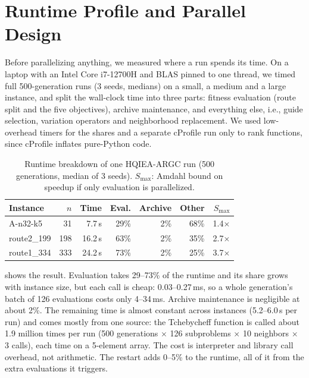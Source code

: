 \section{Runtime Profile and Parallel Design}
\label{sec:parallel}

Before parallelizing anything, we measured where a run spends its time. On a
laptop with an Intel Core i7-12700H and BLAS pinned to one thread, we timed full 500-generation
runs (3 seeds, medians) on a small, a medium and a large instance, and split the
wall-clock time into three parts: fitness evaluation (route split and the five
objectives), archive maintenance, and everything else, i.e., guide selection,
variation operators and neighborhood replacement. We used low-overhead timers for
the shares and a separate cProfile run only to rank functions, since cProfile
inflates pure-Python code.

\begin{table}[t]
\centering
\caption{Runtime breakdown of one HQIEA-ARGC run (500 generations, median of 3
seeds). $S_{\max}$: Amdahl bound on speedup if only evaluation is parallelized.}
\label{tab:profile}
\setlength{\tabcolsep}{3.5pt}
\begin{tabular}{@{}lrrrrrr@{}}
\toprule
Instance & $n$ & Time & Eval. & Archive & Other & $S_{\max}$ \\
\midrule
A-n32-k5    & 31  & 7.7\,s  & 29\% & 2\% & 68\% & 1.4$\times$ \\
route2\_199 & 198 & 16.2\,s & 63\% & 2\% & 35\% & 2.7$\times$ \\
route1\_334 & 333 & 24.2\,s & 73\% & 2\% & 25\% & 3.7$\times$ \\
\bottomrule
\end{tabular}
\end{table}

 shows the result. Evaluation takes 29--73\% of the runtime and
its share grows with instance size, but each call is cheap: 0.03--0.27\,ms, so a
whole generation's batch of 126 evaluations costs only 4--34\,ms. Archive
maintenance is negligible at about 2\%. The remaining time is almost constant
across instances (5.2--6.0\,s per run) and comes mostly from one source: the
Tchebycheff function is called about 1.9 million times per run (500 generations
$\times$ 126 subproblems $\times$ 10 neighbors $\times$ 3 calls), each time on a
5-element array. The cost is interpreter and library call overhead, not
arithmetic. The restart adds 0--5\% to the runtime, all of it from the extra
evaluations it triggers.

